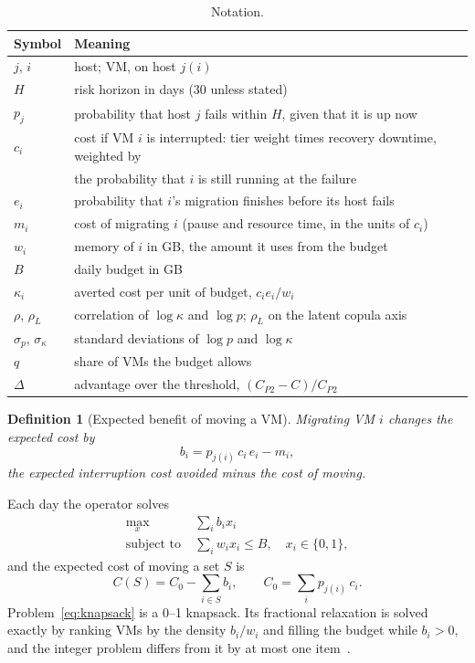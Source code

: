 \documentclass[pdflatex,sn-mathphys-num,iicol]{sn-jnl}
\theoremstyle{thmstyleone}%
\theoremstyle{thmstylethree}%
\newtheorem{definition}{Definition}%
\begin{document}
\begin{table}[!t]\centering
\caption{Notation.}\label{tab:notation}
\footnotesize
\begin{tabular}{ll}\toprule
Symbol & Meaning \\ \midrule
$j$, $i$ & host; VM, on host $j(i)$ \\
$H$ & risk horizon in days (30 unless stated) \\
$p_j$ & probability that host $j$ fails within $H$, given that it is up now \\
$c_i$ & cost if VM $i$ is interrupted: tier weight times recovery downtime, weighted by \\
 & the probability that $i$ is still running at the failure \\
$e_i$ & probability that $i$'s migration finishes before its host fails \\
$m_i$ & cost of migrating $i$ (pause and resource time, in the units of $c_i$) \\
$w_i$ & memory of $i$ in GB, the amount it uses from the budget \\
$B$ & daily budget in GB \\
$\kappa_i$ & averted cost per unit of budget, $c_i e_i / w_i$ \\
$\rho$, $\rho_L$ & correlation of $\log\kappa$ and $\log p$; $\rho_L$ on the latent copula axis \\
$\sigma_p$, $\sigma_\kappa$ & standard deviations of $\log p$ and $\log\kappa$ \\
$q$ & share of VMs the budget allows \\
$\Delta$ & advantage over the threshold, $(C_{P2}-C)/C_{P2}$ \\
\bottomrule\end{tabular}
\end{table}

\begin{definition}[Expected benefit of moving a VM]\label{def:benefit}
Migrating VM $i$ changes the expected cost by
\begin{equation}
b_i = p_{j(i)}\, c_i\, e_i - m_i ,
\label{eq:benefit}
\end{equation}
the expected interruption cost avoided minus the cost of moving.
\end{definition}

Each day the operator solves
\begin{equation}
\begin{aligned}
\max_x \; & \sum_i b_i x_i \\
\text{subject to} \; & \sum_i w_i x_i \le B, \quad x_i \in \{0,1\},
\end{aligned}
\label{eq:knapsack}
\end{equation}
and the expected cost of moving a set $S$ is
\begin{equation}
C(S) = C_0 - \sum_{i \in S} b_i, \qquad C_0 = \sum_i p_{j(i)}\, c_i .
\label{eq:cost}
\end{equation}
Problem~\eqref{eq:knapsack} is a 0--1 knapsack. Its fractional relaxation is solved exactly by
ranking VMs by the density $b_i / w_i$ and filling the budget while $b_i > 0$, and the integer
problem differs from it by at most one item~\cite{dantzig1957discrete}.
\end{document}
